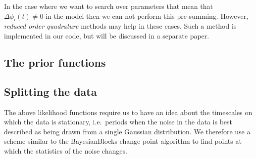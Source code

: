 In the case where we want to search over parameters that mean that $\Delta\phi_i(t) \ne 0$ in the model then
we can not perform this pre-summing. However, {\it reduced order quadrature} methods
\citep[e.g.][]{2014PhRvX...4c1006F, 2015PhRvL.114g1104C} may help in these cases. Such a method is implemented in our
code, but will be discussed in a separate paper.

\subsection{The prior functions}

\subsection{Splitting the data}\label{sec:splitting}

The above likelihood functions require us to have an idea about the timescales on which the data is
stationary, i.e.\ periods when the noise in the data is best described as being drawn from a single
Gaussian distribution. We therefore use a scheme similar to the BayesianBlocks change point algorithm
\citep{1998ApJ...504..405S} to find points at which the statistics of the noise changes.

  
  
  